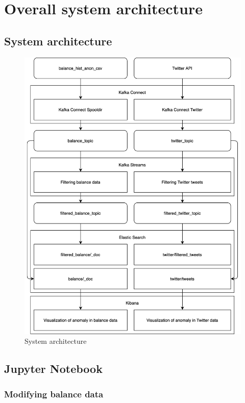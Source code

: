 \documentclass{article}
\begin{document}
\newpage
\section{Overall system architecture}
\subsection{System architecture}

\begin{figure}[h!]
\centering
\includegraphics[scale=0.115]{architecture.png}
\caption{System architecture}
\label{fig:universe}
\end{figure}

\newpage
\subsection{Jupyter Notebook}
\subsubsection{Modifying balance data}
\end{document}
